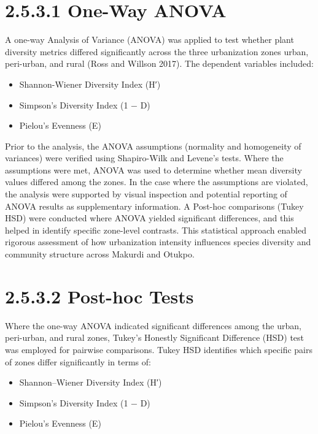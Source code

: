 \hypertarget{one-way-anova}{%
\section{\texorpdfstring{\textbf{2.5.3.1 One-Way ANOVA}}{2.5.3.1 One-Way ANOVA}}\label{one-way-anova}}

A one-way Analysis of Variance (ANOVA) was applied to test whether plant diversity metrics differed significantly across the three urbanization zones urban, peri-urban, and rural (Ross and Willson 2017). The dependent variables included:
\begin{itemize}
\item
  Shannon-Wiener Diversity Index (H′)
\item
  Simpson's Diversity Index (1 − D)
\item
  Pielou's Evenness (E)
\end{itemize}

Prior to the analysis, the ANOVA assumptions (normality and homogeneity of variances) were verified using Shapiro-Wilk and Levene's tests. Where the assumptions were met, ANOVA was used to determine whether mean diversity values differed among the zones. In the case where the assumptions are violated, the analysis were supported by visual inspection and potential reporting of ANOVA results as supplementary information. A Post-hoc comparisons (Tukey HSD) were conducted where ANOVA yielded significant differences, and this helped in identify specific zone-level contrasts. This statistical approach enabled rigorous assessment of how urbanization intensity influences species diversity and community structure across Makurdi and Otukpo.
\hypertarget{post-hoc-tests}{%
\section{\texorpdfstring{\textbf{2.5.3.2 Post-hoc Tests}}{2.5.3.2 Post-hoc Tests}}\label{post-hoc-tests}}

Where the one-way ANOVA indicated significant differences among the urban, peri-urban, and rural zones, Tukey's Honestly Significant Difference (HSD) test was employed for pairwise comparisons. Tukey HSD identifies which specific pairs of zones differ significantly in terms of:
\begin{itemize}
\item
  Shannon--Wiener Diversity Index (H′)
\item
  Simpson's Diversity Index (1 − D)
\item
  Pielou's Evenness (E)
\end{itemize}

